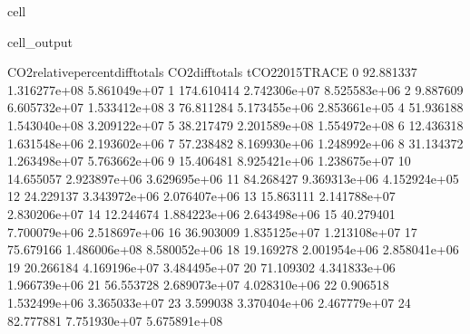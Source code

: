 \documentclass[letterpaper,10pt,english]{jupyterBook}
\begin{document}
\begin{sphinxuseclass}{cell}
\begin{sphinxVerbatimOutput}
\begin{sphinxuseclass}{cell_output}
\begin{sphinxVerbatim}[commandchars=\\\{\}]
    CO2\PYGZus{}relative\PYGZus{}percent\PYGZus{}diff\PYGZus{}totals  CO2\PYGZus{}diff\PYGZus{}totals  tCO2\PYGZus{}2015\PYGZus{}TRACE  \PYGZbs{}
0                         \PYGZhy{}92.881337    \PYGZhy{}1.316277e+08     5.861049e+07   
1                        \PYGZhy{}174.610414    \PYGZhy{}2.742306e+07     8.525583e+06   
2                          \PYGZhy{}9.887609    \PYGZhy{}6.605732e+07     1.533412e+08   
3                          76.811284     5.173455e+06     2.853661e+05   
4                          51.936188     1.543040e+08     3.209122e+07   
5                         \PYGZhy{}38.217479    \PYGZhy{}2.201589e+08     1.554972e+08   
6                          12.436318     1.631548e+06     2.193602e+06   
7                          57.238482     8.169930e+06     1.248992e+06   
8                          31.134372     1.263498e+07     5.763662e+06   
9                         \PYGZhy{}15.406481    \PYGZhy{}8.925421e+06     1.238675e+07   
10                         14.655057     2.923897e+06     3.629695e+06   
11                         84.268427     9.369313e+06     4.152924e+05   
12                         24.229137     3.343972e+06     2.076407e+06   
13                        \PYGZhy{}15.863111    \PYGZhy{}2.141788e+07     2.830206e+07   
14                         12.244674     1.884223e+06     2.643498e+06   
15                         40.279401     7.700079e+06     2.518697e+06   
16                        \PYGZhy{}36.903009    \PYGZhy{}1.835125e+07     1.213108e+07   
17                         75.679166     1.486006e+08     8.580052e+06   
18                        \PYGZhy{}19.169278    \PYGZhy{}2.001954e+06     2.858041e+06   
19                         20.266184     4.169196e+07     3.484495e+07   
20                        \PYGZhy{}71.109302    \PYGZhy{}4.341833e+06     1.966739e+06   
21                         56.553728     2.689073e+07     4.028310e+06   
22                         \PYGZhy{}0.906518    \PYGZhy{}1.532499e+06     3.365033e+07   
23                          3.599038    \PYGZhy{}3.370404e+06     2.467779e+07   
24                         82.777881    \PYGZhy{}7.751930e+07     5.675891e+08   


\end{sphinxVerbatim}
\end{sphinxuseclass}
\end{sphinxVerbatimOutput}
\end{sphinxuseclass}
\end{document}
